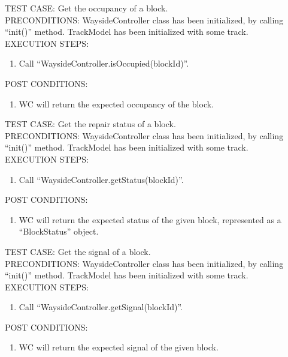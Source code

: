 \documentclass{scrreprt}
\begin{document}
        TEST CASE: Get the occupancy of a block.\\
        PRECONDITIONS: WaysideController class has been initialized, by calling ``init()'' method.
            TrackModel has been initialized with some track.\\
        EXECUTION STEPS: \begin{enumerate}
            \item Call ``WaysideController.isOccupied(blockId)''.
        \end{enumerate}
        POST CONDITIONS: \begin{enumerate}
            \item WC will return the expected occupancy of the block.
        \end{enumerate}

        TEST CASE: Get the repair status of a block.\\
        PRECONDITIONS: WaysideController class has been initialized, by calling ``init()'' method.
        TrackModel has been initialized with some track.\\
        EXECUTION STEPS: \begin{enumerate}
            \item Call ``WaysideController.getStatus(blockId)''.
        \end{enumerate}
        POST CONDITIONS: \begin{enumerate}
            \item WC will return the expected status of the given block, represented as a ``BlockStatus'' object.
        \end{enumerate}

        TEST CASE: Get the signal of a block.\\
        PRECONDITIONS: WaysideController class has been initialized, by calling ``init()'' method.
        TrackModel has been initialized with some track.\\
        EXECUTION STEPS: \begin{enumerate}
            \item Call ``WaysideController.getSignal(blockId)''.
        \end{enumerate}
        POST CONDITIONS: \begin{enumerate}
            \item WC will return the expected signal of the given block.
        \end{enumerate}
\end{document}
